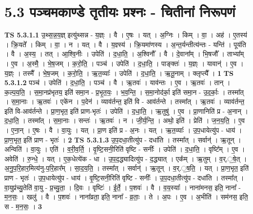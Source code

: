 \documentclass[17pt]{extarticle}
\begin{document}
\section*{ 5.3      पञ्चमकाण्डे तृतीयः प्रश्नः - चितीनां निरूपणं }
                                \textbf{ TS 5.3.1.1} \newline
                  उ॒थ्स॒न्न॒य॒ज्ञ् इत्यु॑थ्सन्न - य॒ज्ञ्ः । वै । ए॒षः । यत् । अ॒ग्निः । किम् । वा॒ । अह॑ । ए॒तस्य॑ । क्रि॒यते᳚ । किम् । वा॒ । न । यत् । वै । य॒ज्ञ्स्य॑ । क्रि॒यमा॑णस्य । अ॒न्त॒र्यन्तीत्य॑न्तः - यन्ति॑ । पूय॑ति । वै । अ॒स्य॒ । तत् । आ॒श्वि॒नीः । उपेति॑ । द॒धा॒ति॒ । अ॒श्विनौ᳚ । वै । दे॒वाना᳚म् । भि॒षजौ᳚ । ताभ्या᳚म् । ए॒व । अ॒स्मै॒ । भे॒ष॒जम् । क॒रो॒ति॒ । पञ्च॑ । उपेति॑ । द॒धा॒ति॒ । पाङ्क्तः॑ । य॒ज्ञ्ः । यावान्॑ । ए॒व । य॒ज्ञ्ः । तस्मै᳚ । भे॒ष॒जम् । क॒रो॒ति॒ । ऋ॒त॒व्याः᳚ । उपेति॑ । द॒धा॒ति॒ । ऋ॒तू॒नाम् । क्लृप्त्यै᳚ । \textbf{  1} \newline
                  \newline
                                \textbf{ TS 5.3.1.2} \newline
                  पञ्च॑ । उपेति॑ । द॒धा॒ति॒ । पञ्च॑ । वै । ऋ॒तवः॑ । याव॑न्तः । ए॒व । ऋ॒तवः॑ । तान् । क॒ल्प॒य॒ति॒ । स॒मा॒नप्र॑भृतय॒ इति॑ समा॒न - प्र॒भृ॒त॒यः॒ । भ॒व॒न्ति॒ । स॒मा॒नोद॑र्का॒ इति॑ समा॒न - उ॒द॒र्काः॒ । तस्मा᳚त् । स॒मा॒नाः । ऋ॒तवः॑ । एके॑न । प॒देन॑ । व्याव॑र्तन्त॒ इति॑ वि - आव॑र्तन्ते । तस्मा᳚त् । ऋ॒तवः॑ । व्याव॑र्तन्त॒ इति॑ वि-आव॑र्तन्ते । प्रा॒ण॒भृत॒ इति॑ प्राण-भृतः॑ । उपेति॑ । द॒धा॒ति॒ । ऋ॒तुषु॑ । ए॒व । प्रा॒णानिति॑ प्र - अ॒नान् । द॒धा॒ति॒ । तस्मा᳚त् । स॒मा॒नाः । सन्तः॑ । ऋ॒तवः॑ । न । जी॒र्य॒न्ति॒ । अथो॒ इति॑ । प्रेति॑ । ज॒न॒य॒ति॒ । ए॒व । ए॒ना॒न् । ए॒षः । वै । वा॒युः । यत् । प्रा॒ण इति॑ प्र - अ॒नः । यत् । ऋ॒त॒व्याः᳚ । उ॒प॒धायेत्यु॑प - धाय॑ । प्रा॒ण॒भृत॒ इति॑ प्राण - भृतः॑ । \textbf{  2} \newline
                  \newline
                                \textbf{ TS 5.3.1.3} \newline
                  उ॒प॒दधा॒तीत्यु॑प - दधा॑ति । तस्मा᳚त् । सर्वान्॑ । ऋ॒तून् । अन्विति॑ । वा॒युः । एति॑ । व॒री॒व॒र्ति॒ । वृ॒ष्टि॒सनी॒रिति॑ वृष्टि - सनीः᳚ । उपेति॑ । द॒धा॒ति॒ । वृष्टि᳚म् । ए॒व । अवेति॑ । रु॒न्धे॒ । यत् । ए॒क॒धेत्ये॑क - धा । उ॒प॒द॒द्ध्यादित्यु॑प - द॒द्ध्यात् । एक᳚म् । ऋ॒तुम् । व॒र्.॒षे॒त् । अ॒नु॒प॒रि॒हार॒मित्य॑नु-प॒रि॒हार᳚म् । सा॒द॒य॒ति॒ । तस्मा᳚त् । सर्वान्॑ । ऋ॒तून् । व॒र्.॒ष॒ति॒ । यत् । प्रा॒ण॒भृत॒ इति॑ प्राण - भृतः॑ । उ॒प॒धायेत्यु॑प - धाय॑ । वृ॒ष्टि॒सनी॒रिति॑ वृष्टि - सनीः᳚ । उ॒प॒दधा॒तीत्यु॑प - दधा॑ति । तस्मा᳚त् । वा॒युप्र॑च्यु॒तेति॑ वा॒यु - प्र॒च्यु॒ता॒ । दि॒वः । वृष्टिः॑ । ई॒र्ते॒ । प॒शवः॑ । वै । व॒य॒स्याः᳚ । नाना॑मनस॒ इति॒ नाना᳚ - म॒न॒सः॒ । खलु॑ । वै । प॒शवः॑ । नाना᳚व्रता॒ इति॒ नाना᳚ - व्र॒ताः॒ । ते । अ॒पः । ए॒व । अ॒भीति॑ । सम॑नस॒ इति॒ स - म॒न॒सः॒ । \textbf{  3} \newline
\end{document}
